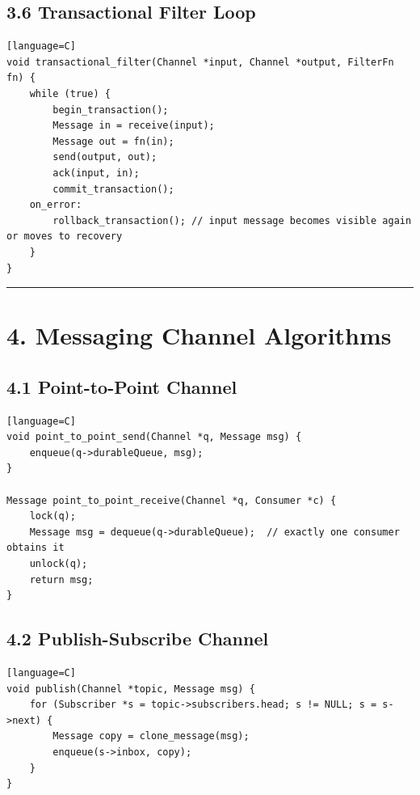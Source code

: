 \documentclass[11pt]{article}
\begin{document}
\subsection{3.6 Transactional Filter
Loop}\label{transactional-filter-loop}

\begin{verbatim}[language=C]
void transactional_filter(Channel *input, Channel *output, FilterFn fn) {
    while (true) {
        begin_transaction();
        Message in = receive(input);
        Message out = fn(in);
        send(output, out);
        ack(input, in);
        commit_transaction();
    on_error:
        rollback_transaction(); // input message becomes visible again or moves to recovery
    }
}
\end{verbatim}

\begin{center}\rule{0.5\linewidth}{0.5pt}\end{center}

\section{4. Messaging Channel
Algorithms}\label{messaging-channel-algorithms}

\subsection{4.1 Point-to-Point Channel}\label{point-to-point-channel}

\begin{verbatim}[language=C]
void point_to_point_send(Channel *q, Message msg) {
    enqueue(q->durableQueue, msg);
}

Message point_to_point_receive(Channel *q, Consumer *c) {
    lock(q);
    Message msg = dequeue(q->durableQueue);  // exactly one consumer obtains it
    unlock(q);
    return msg;
}
\end{verbatim}

\subsection{4.2 Publish-Subscribe
Channel}\label{publish-subscribe-channel}

\begin{verbatim}[language=C]
void publish(Channel *topic, Message msg) {
    for (Subscriber *s = topic->subscribers.head; s != NULL; s = s->next) {
        Message copy = clone_message(msg);
        enqueue(s->inbox, copy);
    }
}
\end{verbatim}
\end{document}
